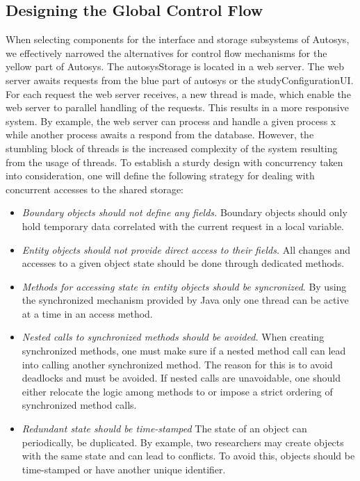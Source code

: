 \subsection{Designing the Global Control Flow}
When selecting components for the interface and storage subsystems of Autosys, we effectively narrowed the alternatives for control flow mechanisms for the yellow part of Autosys. The autosysStorage is located in a web server. The web server awaits requests from the blue part of autosys or the studyConfigurationUI. For each request the web server receives, a new thread is made, which enable the web server to parallel handling of the requests. This results in a more responsive system. By example, the web server can process and handle a given process x while another process awaits a respond from the database. However, the stumbling block of threads is the increased complexity of the system resulting from the usage of threads. To establish a sturdy design with concurrency taken into consideration, one will define the following strategy for dealing with concurrent accesses to the shared storage:
\begin{itemize}
	\item \textit{Boundary objects should not define any fields.} Boundary objects should only hold temporary data correlated with the current request in a local variable.
	\item \textit{Entity objects should not provide direct access to their fields.} All changes and accesses to a given object state should be done through dedicated methods. 
	\item \textit{Methods for accessing state in entity objects should be syncronized}. By using the synchronized mechanism provided by Java only one thread can be active at a time in an access method.
	\item \textit{Nested calls to synchronized methods should be avoided.} When creating synchronized methods, one must make sure if a nested method call can lead into calling another synchronized method. The reason for this is to avoid deadlocks and must be avoided. If nested calls are unavoidable, one should either relocate the logic among methods to or impose a strict ordering of synchronized method calls.
	\item \textit{Redundant state should be time-stamped} The state of an object can periodically, be duplicated. By example, two researchers may create objects with the same state and can lead to conflicts. To avoid this, objects should be time-stamped or have another unique identifier.

\end{itemize}


